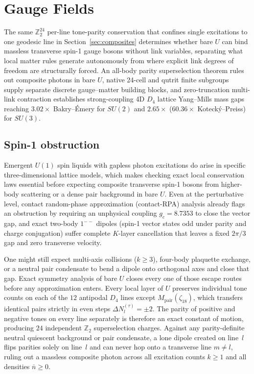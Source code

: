 \section{Gauge Fields}
\label{sec:gauge}

The same $\mathbb{Z}_2^{24}$ per-line tone-parity conservation that confines single excitations to one geodesic line in
Section~\ref{sec:composites} determines whether bare $U$ can bind massless transverse spin-1 gauge bosons without link
variables, separating what local matter rules generate autonomously from where explicit link degrees of freedom are
structurally forced. An all-body parity superselection theorem rules out composite photons in bare $U$, native 24-cell
and qutrit finite subgroups supply separate discrete gauge--matter building blocks, and zero-truncation multi-link
contraction establishes strong-coupling 4D $D_4$ lattice Yang--Mills mass gaps reaching $3.02\times$ Bakry--\'Emery for
$SU(2)$ and $2.65\times$ ($60.36\times$ Koteck\'y--Preiss) for $SU(3)$.

\subsection{Spin-1 obstruction}

Emergent $U(1)$ spin liquids with gapless photon excitations do arise in specific three-dimensional lattice models,
which makes checking exact local conservation laws essential before expecting composite transverse spin-1 bosons from
higher-body scattering or a dense pair background in bare $U$. Even at the perturbative level, contact random-phase
approximation (contact-RPA) analysis already flags an obstruction by requiring an unphysical coupling $g_c = 8.7353$ to
close the vector gap, and exact two-body $1^{--}$ dipoles (spin-1 vector states odd under parity and charge conjugation)
suffer complete $K$-layer cancellation that leaves a fixed $2\pi/3$ gap and zero transverse velocity.

One might still expect multi-axis collisions ($k \ge 3$), four-body plaquette exchange, or a neutral pair condensate to
bend a dipole onto orthogonal axes and close that gap. Exact symmetry analysis of bare $U$ closes every one of those
escape routes before any approximation enters. Every local layer of $U$ preserves individual tone counts on each of the
$12$ antipodal $D_4$ lines except $M_{\mathrm{pair}}(\zeta_{18})$, which transfers identical pairs strictly in even
steps $\Delta N_l^{(\tau)} = \pm 2$. The parity of positive and negative tones on every line separately is therefore an
exact constant of motion, producing $24$ independent $\mathbb{Z}_2$ superselection charges. Against any parity-definite
neutral quiescent background or pair condensate, a lone dipole created on line~$l$ flips parities solely on line~$l$ and
can never hop onto a transverse line $m \neq l$, ruling out a massless composite photon across all excitation counts
$k \ge 1$ and all densities $\bar{n} \ge 0$.

